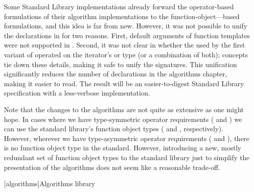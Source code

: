 \documentclass[american,twoside]{book}
\begin{document}
\begin{titlepage}
Some Standard Library implementations already forward the
operator-based formulations of their algorithm implementations to the
function-object---based formulations, and this idea is far from
new. However, it was not possible to unify the declarations in 
for two reasons. First, default arguments of function templates were
not supported in . Second, it was not clear in  whether
the  used by the first variant of 
operated on the iterator's  or 
type (or a combination of both); concepts tie down these details,
making it safe to unify the signatures. This unification significantly
reduces the number of declarations in the algorithms chapter, making
it easier to read. The result will be an easier-to-digest Standard
Library specification with a less-verbose implementation.

Note that the changes to the algorithms are not quite as extensive as
one might hope. In cases where we have type-symmetric operator
requirements ( and
) we can use the standard library's function
object types ( and ,
respectively). However, wherever we have type-asymmetric operator
requirements ( and ), there is no
function object type in the standard. However, introducing a new,
mostly redundant set of function object types to the standard library
just to simplify the presentation of the algorithms does not seem like
a reasonable trade-off.
\end{titlepage}

\pagestyle{fancy}
\fancyhead[LE,RO]{\textbf{\rightmark}}
\fancyhead[RE]{\textbf{\leftmark\hspace{1em}\thepage}}
\fancyhead[LO]{\textbf{\thepage\hspace{1em}\leftmark}}


\renewcommand{\sectionmark}[1]{\markright{\thesection\hspace{1em}#1}}
\renewcommand{\chaptermark}[1]{\markboth{#1}{}}

\color{black}

\setcounter{chapter}{24}
[algorithms]{Algorithms library}
\end{document}
